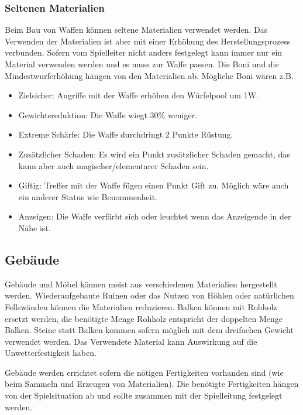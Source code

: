 \documentclass{article}
\begin{document}
\subsubsection{Seltenen Materialien}

Beim Bau von Waffen können seltene Materialien verwendet werden. Das Verwenden der Materialien ist aber mit einer
Erhöhung des Herstellungsprozess verbunden. Sofern vom Spielleiter nicht anders festgelegt kann immer nur ein
Material verwenden werden und es muss zur Waffe passen. Die Boni und die Mindestwurferhöhung hängen von den
Materialien ab. Mögliche Boni wären z.B.

\begin{itemize}
\item Zielsicher: Angriffe mit der Waffe erhöhen den Würfelpool um 1W.
\item Gewichtsreduktion: Die Waffe wiegt 30\% weniger.
\item Extreme Schärfe: Die Waffe durchdringt 2 Punkte Rüstung.
\item Zusätzlicher Schaden: Es wird ein Punkt zusätzlicher Schaden gemacht, das kann aber auch magischer/elementarer Schaden sein.
\item Giftig: Treffer mit der Waffe fügen einen Punkt Gift zu. Möglich wäre auch ein anderer Status wie Benommenheit.
\item Anzeigen: Die Waffe verfärbt sich oder leuchtet wenn das Anzeigende in der Nähe ist.
\end{itemize}

\begin{center}
\subsection{Gebäude}
\end{center}

Gebäude und Möbel können meist aus verschiedenen Materialien hergestellt werden. Wiederaufgebaute Ruinen oder das
Nutzen von Höhlen oder natürlichen Fellswänden können die Materialien reduzieren. Balken können mit Rohholz ersetzt
werden, die benötigte Menge Rohholz entspricht der doppelten Menge Balken. Steine statt Balken kommen sofern möglich
mit dem dreifachen Gewicht verwendet werden. Das Verwendete Material kann Auswirkung auf die Unwetterfestigkeit
haben.

Gebäude werden errichtet sofern die nötigen Fertigkeiten vorhanden sind (wie beim Sammeln und Erzeugen von Materialien).
Die benötigte Fertigkeiten hängen von der Spielsituation ab und sollte zusammen mit der Spielleitung festgelegt
werden.
\end{document}
